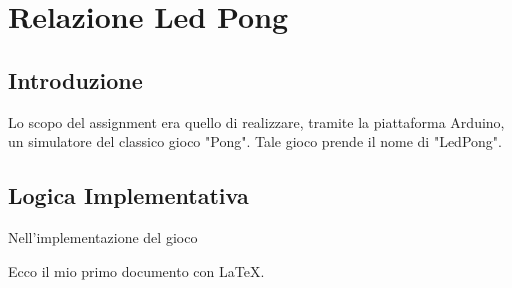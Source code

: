 \documentclass[a4paper]{article}
\begin{document}
\section*{Relazione Led Pong} 
\subsection*{Introduzione}
Lo scopo del assignment era quello di realizzare, tramite la piattaforma Arduino, un simulatore del classico gioco "Pong". Tale gioco prende il nome di "LedPong".
\subsection*{Logica Implementativa}
Nell'implementazione del gioco








Ecco il mio primo documento con \LaTeX.
\end{document}
